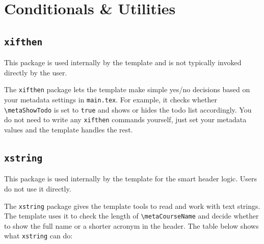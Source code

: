 
\section{Conditionals \& Utilities}

	\subsection{\texttt{xifthen}}
	\noindent\colorbox{themecolour!15}{\parbox{\linewidth}{\small This package is used internally by the template and is not typically invoked directly by the user.}}\vspace{0.5\baselineskip}
	
	The \texttt{xifthen} package lets the template make simple yes/no decisions based on your metadata settings in \texttt{main.tex}. For example, it checks whether \texttt{\textbackslash metaShowTodo} is set to \texttt{true} and shows or hides the todo list accordingly. You do not need to write any \texttt{xifthen} commands yourself, just set your metadata values and the template handles the rest.
	
	\subsection{\texttt{xstring}}
	\noindent\colorbox{themecolour!15}{\parbox{\linewidth}{\small This package is used internally by the template for the smart header logic. Users do not use it directly.}}\vspace{0.5\baselineskip}
	
	The \texttt{xstring} package gives the template tools to read and work with text strings. The template uses it to check the length of \texttt{\textbackslash metaCourseName} and decide whether to show the full name or a shorter acronym in the header. The table below shows what \texttt{xstring} can do:
	
